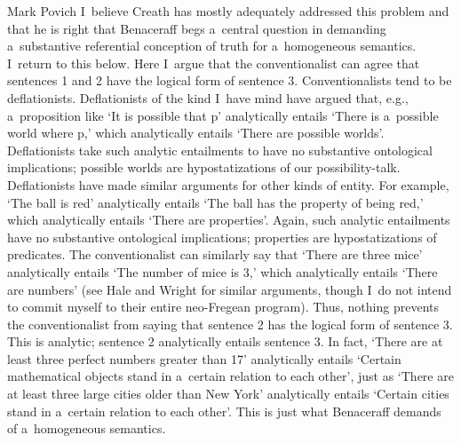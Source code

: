 \begin{artengenv}{Mark Povich}
I~believe Creath
\parencite*[][]{creath_benacerraf_1980} %
 has mostly adequately addressed this problem and that he is right that Benaceraff begs a~central question in demanding a~substantive referential conception of truth for a~homogeneous semantics. I~return to this below. Here I~argue that the conventionalist can agree that sentences 1 and 2 have the logical form of sentence 3. Conventionalists tend to be deflationists. Deflationists of the kind I~have mind 
\parencites[][]{carnap_empiricism_1950}[][]{Schiffer2003}[][]{thomasson_ontology_2014}[see also][]{price_naturalism_2011} %
 have argued that, e.g., a~proposition like ‘It is possible that p' analytically entails ‘There is a~possible world where p,' which analytically entails ‘There are possible worlds'. Deflationists take such analytic entailments to have no substantive ontological implications; possible worlds are hypostatizations of our possibility-talk. Deflationists have made similar arguments for other kinds of entity. For example, ‘The ball is red' analytically entails ‘The ball has the property of being red,' which analytically entails ‘There are properties'. Again, such analytic entailments have no substantive ontological implications; properties are hypostatizations of predicates. The conventionalist can similarly say that ‘There are three mice' analytically entails ‘The number of mice is 3,' which analytically entails ‘There are numbers' (see Hale and Wright 
\parencite*[][]{hale_reasons_2001} %
 for similar arguments, though I~do not intend to commit myself to their entire neo-Fregean program). Thus, nothing prevents the conventionalist from saying that sentence 2 has the logical form of sentence 3. This is analytic; sentence 2 analytically entails sentence 3. In fact, ‘There are at least three perfect numbers greater than 17' analytically entails ‘Certain mathematical objects stand in a~certain relation to each other', just as ‘There are at least three large cities older than New York' analytically entails ‘Certain cities stand in a~certain relation to each other'. This is just what Benaceraff demands of a~homogeneous semantics.


\end{artengenv}

